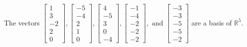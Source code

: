 \begin{exercise}
\begin{exerciseStatement}
  \end{exerciseStatement}
  \begin{exerciseAnswer}
   The vectors \(\left[\begin{array}{r}
1 \\
3 \\
-2 \\
2 \\
0
\end{array}\right] , \left[\begin{array}{r}
-5 \\
-4 \\
2 \\
1 \\
0
\end{array}\right] , \left[\begin{array}{r}
4 \\
-5 \\
3 \\
0 \\
-4
\end{array}\right] , \left[\begin{array}{r}
-1 \\
-4 \\
-2 \\
-2 \\
-2
\end{array}\right] , \text{ and } \left[\begin{array}{r}
-3 \\
-3 \\
-5 \\
-5 \\
-2
\end{array}\right]\) 
  	 are  a basis of \(\mathbb{R}^5\).
  


  \end{exerciseAnswer}
\end{exercise}